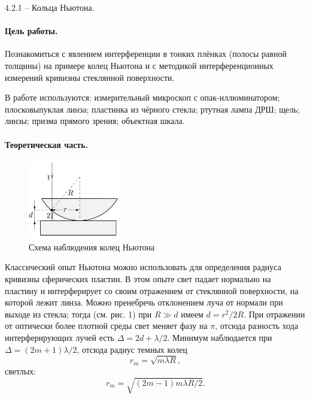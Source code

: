 \documentclass{../lab_class}
\begin{document}
{\Large 4.2.1 -- Кольца Ньютона.}

\paragraph{Цель работы.}
Познакомиться с явлением интерференции в тонких плёнках (полосы равной толщины) на примере колец Ньютона и с методикой интерференционных измерений кривизны стеклянной поверхности.

В работе используются: измерительный микроскоп с опак-иллюминатором; плосковыпуклая линза; пластинка из чёрного стекла; ртутная лампа ДРШ; щель; линзы; призма прямого зрения; объектная шкала.

\paragraph{Теоретическая часть.}
\begin{figure}
	\centering
	\includegraphics[width=4cm]{sch01.png}
	\caption{Схема наблюдения колец Ньютона}
	\label{pic:01}
\end{figure}

Классический опыт Ньютона можно использовать для определения радиуса кривизны сферических пластин. В этом опыте свет падает нормально на пластину и интерферирует со своим отражением от стеклянной поверхности, на которой лежит линза. Можно пренебречь отклонением луча от нормали при выходе из стекла; тогда (см. рис. 1) при $R \gg d$ имеем $d = r^2 / 2R$. При отражении от оптически более плотной среды свет меняет фазу на $\pi$, отсюда разность хода интерферирующих лучей есть $\Delta = 2d + \lambda/2$. Минимум наблюдается при $\Delta = (2m+1) \lambda/2$, отсюда радиус темных колец
\begin{equation}\label{eq:01}
	r_m = \sqrt{m \lambda R},
\end{equation}
светлых:
\begin{equation}\label{eq:02}
	r_m = \sqrt{(2m-1) m \lambda R/2}.
\end{equation}
\end{document}
